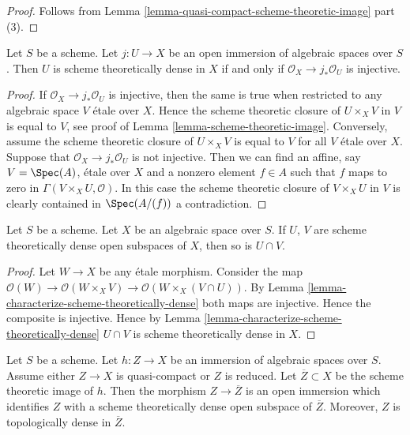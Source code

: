 \begin{proof}
Follows from Lemma \ref{lemma-quasi-compact-scheme-theoretic-image} part (3).
\end{proof}

\begin{lemma}
\label{lemma-characterize-scheme-theoretically-dense}
Let $S$ be a scheme.
Let $j : U \to X$ be an open immersion of algebraic spaces over $S$.
Then $U$ is scheme theoretically dense in $X$ if and only if
$\mathcal{O}_X \to j_*\mathcal{O}_U$ is injective.
\end{lemma}

\begin{proof}
If $\mathcal{O}_X \to j_*\mathcal{O}_U$ is injective,
then the same is true when restricted to any
algebraic space $V$ \'etale over $X$.
Hence the scheme theoretic closure of $U \times_X V$ in $V$
is equal to $V$, see proof of
Lemma \ref{lemma-scheme-theoretic-image}.
Conversely, assume the scheme theoretic
closure of $U \times_X V$ is equal to $V$ for all $V$ \'etale over $X$.
Suppose that $\mathcal{O}_X \to j_*\mathcal{O}_U$ is not injective.
Then we can find an affine, say $V = \Spec(A)$, \'etale over $X$
and a nonzero element $f \in A$ such that $f$ maps to zero in
$\Gamma(V \times_X U, \mathcal{O})$. In this case the scheme theoretic
closure of $V \times_X U$ in $V$ is clearly contained in $\Spec(A/(f))$
a contradiction.
\end{proof}

\begin{lemma}
\label{lemma-intersection-scheme-theoretically-dense}
Let $S$ be a scheme. Let $X$ be an algebraic space over $S$.
If $U$, $V$ are scheme theoretically dense
open subspaces of $X$, then so is $U \cap V$.
\end{lemma}

\begin{proof}
Let $W \to X$ be any \'etale morphism. Consider the map
$\mathcal{O}(W) \to \mathcal{O}(W \times_X V)
\to \mathcal{O}(W \times_X (V \cap U))$.
By Lemma \ref{lemma-characterize-scheme-theoretically-dense}
both maps are injective. Hence the composite is injective.
Hence by Lemma \ref{lemma-characterize-scheme-theoretically-dense}
$U \cap V$ is scheme theoretically dense in $X$.
\end{proof}

\begin{lemma}
\label{lemma-quasi-compact-immersion}
Let $S$ be a scheme. Let $h : Z \to X$ be an immersion of algebraic spaces
over $S$. Assume either $Z \to X$ is quasi-compact or $Z$ is reduced.
Let $\overline{Z} \subset X$ be the scheme theoretic image of $h$.
Then the morphism $Z \to \overline{Z}$ is an open immersion
which identifies $Z$ with a scheme theoretically dense open
subspace of $\overline{Z}$. Moreover, $Z$ is topologically
dense in $\overline{Z}$.
\end{lemma}

